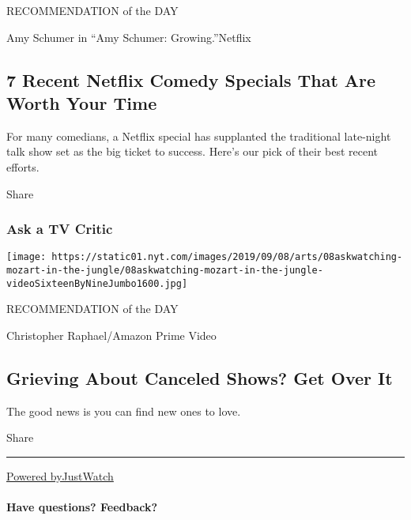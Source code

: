 RECOMMENDATION of the DAY

Amy Schumer in ``Amy Schumer: Growing.''Netflix

\hypertarget{7-recent-netflix-comedy-specials-that-are-worth-your-time}{%
\subsection{7 Recent Netflix Comedy Specials That Are Worth Your
Time}\label{7-recent-netflix-comedy-specials-that-are-worth-your-time}}

For many comedians, a Netflix special has supplanted the traditional
late-night talk show set as the big ticket to success. Here's our pick
of their best recent efforts.

Share

\hypertarget{ask-a-tv-critic}{%
\subsubsection{Ask a TV Critic}\label{ask-a-tv-critic}}

\href{https://www.nytimes.com/2019/09/06/arts/television/watching-canceled-shows.html}{}

\texttt{[image: https://static01.nyt.com/images/2019/09/08/arts/08askwatching-mozart-in-the-jungle/08askwatching-mozart-in-the-jungle-videoSixteenByNineJumbo1600.jpg]}

RECOMMENDATION of the DAY

Christopher Raphael/Amazon Prime Video

\hypertarget{grieving-about-canceled-shows-get-over-it}{%
\subsection{Grieving About Canceled Shows? Get Over
It}\label{grieving-about-canceled-shows-get-over-it}}

The good news is you can find new ones to love.

Share

\begin{center}\rule{0.5\linewidth}{\linethickness}\end{center}

\href{https://www.gowatchit.com}{Powered byJustWatch}

\hypertarget{have-questions-feedback}{%
\paragraph{Have questions? Feedback?}\label{have-questions-feedback}}


